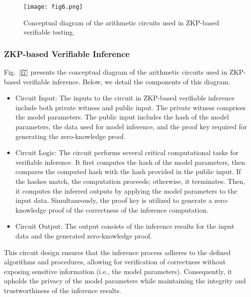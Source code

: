 \documentclass[journal]{IEEEtran}
\begin{document}
\begin{figure*}[!t]
    \centering
    \texttt{[image: fig6.png]}
    \caption{Conceptual diagram of the arithmetic circuits used in ZKP-based verifiable testing.}
    \label{f6}
\end{figure*}




\subsubsection{\bf ZKP-based Verifiable Inference} Fig.~\ref{f7} presents the conceptual diagram of the arithmetic circuits used in ZKP-based verifiable inference. Below, we detail the components of this diagram.

\begin{itemize}

\item {Circuit Input}: The inputs to the circuit in ZKP-based verifiable inference include both private witness and public input. The private witness comprises the model parameters. The public input includes the hash of the model parameters, the data used for model inference, and the proof key required for generating the zero-knowledge proof.

\item {Circuit Logic}: The circuit performs several critical computational tasks for verifiable inference. It first computes the hash of the model parameters, then compares the computed hash with the hash provided in the public input. If the hashes match, the computation proceeds; otherwise, it terminates. Then, it computes the inferred outputs by applying the model parameters to the input data. Simultaneously, the proof key is utilized to generate a zero-knowledge proof of the correctness of the inference computation. 

\item {Circuit Output}: The output consists of the inference results for the input data and the generated zero-knowledge proof. 

\end{itemize}

This circuit design ensures that the inference process adheres to the defined algorithms and procedures, allowing for verification of correctness without exposing sensitive information (i.e., the model parameters). Consequently, it upholds the privacy of the model parameters  while maintaining the integrity and trustworthiness of the inference results.
\end{document}
